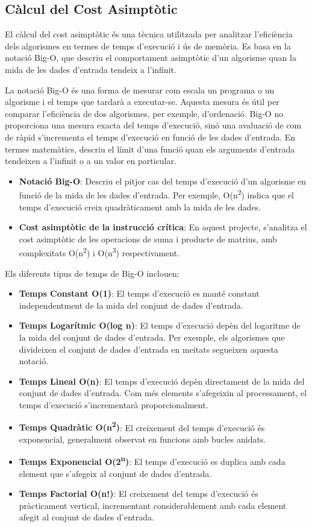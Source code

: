 \documentclass{ieeetj}
\begin{document}
\subsection{Càlcul del Cost Asimptòtic}
El càlcul del cost asimptòtic és una tècnica utilitzada per analitzar l'eficiència dels algorismes en termes de temps d'execució i ús de memòria. Es basa en la notació Big-O, que descriu el comportament asimptòtic d'un algorisme quan la mida de les dades d'entrada tendeix a l'infinit.

La notació Big-O és una forma de mesurar com escala un programa o un algorisme i el temps que tardarà a executar-se. Aquesta mesura és útil per comparar l'eficiència de dos algorismes, per exemple, d'ordenació. Big-O no proporciona una mesura exacta del temps d'execució, sinó una avaluació de com de ràpid s'incrementa el temps d'execució en funció de les dades d'entrada. En termes matemàtics, descriu el límit d'una funció quan els arguments d'entrada tendeixen a l'infinit o a un valor en particular.

\begin{itemize}
    \item \textbf{Notació Big-O}: Descriu el pitjor cas del temps d'execució d'un algorisme en funció de la mida de les dades d'entrada. Per exemple, O(n\textsuperscript{2}) indica que el temps d'execució creix quadràticament amb la mida de les dades.
    \item \textbf{Cost asimptòtic de la instrucció crítica}: En aquest projecte, s'analitza el cost asimptòtic de les operacions de suma i producte de matrius, amb complexitats O(n\textsuperscript{2}) i O(n\textsuperscript{3}) respectivament.
\end{itemize}

Els diferents tipus de temps de Big-O inclouen:
\begin{itemize}
    \item \textbf{Temps Constant O(1)}: El temps d'execució es manté constant independentment de la mida del conjunt de dades d'entrada.
    \item \textbf{Temps Logarítmic O(log n)}: El temps d'execució depèn del logaritme de la mida del conjunt de dades d'entrada. Per exemple, els algorismes que divideixen el conjunt de dades d'entrada en meitats segueixen aquesta notació.
    \item \textbf{Temps Lineal O(n)}: El temps d'execució depèn directament de la mida del conjunt de dades d'entrada. Com més elements s'afegeixin al processament, el temps d'execució s'incrementarà proporcionalment.
    \item \textbf{Temps Quadràtic O(n\textsuperscript{2})}: El creixement del temps d'execució és exponencial, generalment observat en funcions amb bucles anidats.
    \item \textbf{Temps Exponencial O(2\textsuperscript{n})}: El temps d'execució es duplica amb cada element que s'afegeix al conjunt de dades d'entrada.
    \item \textbf{Temps Factorial O(n!)}: El creixement del temps d'execució és pràcticament vertical, incrementant considerablement amb cada element afegit al conjunt de dades d'entrada.
\end{itemize}
\end{document}

